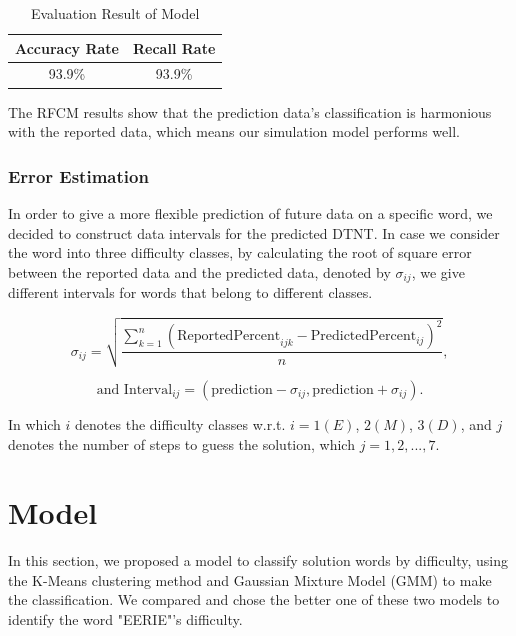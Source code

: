 \documentclass[12pt]{article}
\begin{document}
\begin{table}[]
    \centering
    \begin{tabular}{|c|c|}
    \hline
    \textbf{Accuracy Rate} & \textbf{Recall Rate} \\ \hline
    93.9\%                 & 93.9\%               \\ \hline
    \end{tabular}
    \caption{Evaluation Result of Model \uppercase\expandafter{}}
    \label{table6}
\end{table}

\vspace{0.3cm}
\noindent
The RFCM results show that the prediction data’s classification is harmonious with the reported data, which means our simulation model performs well.

\subsubsection{Error Estimation}

In order to give a more flexible prediction of future data on a specific word, we decided to construct data intervals for the predicted DTNT. In case we consider the word into three difficulty classes, by calculating the root of square error between the reported data and the predicted data, denoted by $\sigma_{ij}$, we give different intervals for words that belong to different classes.

$$
\sigma_{ij}=\sqrt{\frac{\sum_{k=1}^n(\text{ReportedPercent}_{ijk}-\text{PredictedPercent}_{ij})^2}{n}},
$$

$$
\text{and Interval}_{ij}=(\text{prediction}-\sigma_{ij},\text{prediction}+\sigma_{ij}).
$$

\vspace{0.3cm}
\noindent
In which $i$ denotes the difficulty classes w.r.t. $i=1(E)$, $2(M)$, $3(D)$, and $j$ denotes the number of steps to guess the solution, which $j=1,2,...,7$.

\section{Model \uppercase\expandafter{}}

In this section, we proposed a model to classify solution words by difficulty, using the K-Means clustering method and Gaussian Mixture Model (GMM) to make the classification. We compared and chose the better one of these two models to identify the word "EERIE"'s difficulty. 
\end{document}
